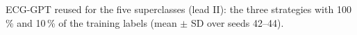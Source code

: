 \begin{table}[htbp]
\centering
\caption[Transfer from the ECG-GPT: main results]{ECG-GPT reused for the five superclasses (lead II): the three strategies with 100\,\% and 10\,\% of the training labels (mean $\pm$ SD over seeds 42--44).}
\label{tab:transfer_main}
\small
\begin{adjustbox}{max width=\textwidth}

\end{adjustbox}
\end{table}
